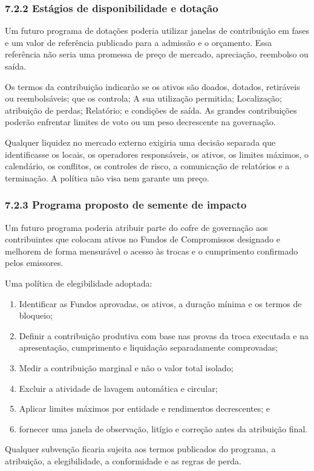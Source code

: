 \documentclass[11pt]{article}
\begin{document}
\subsubsection*{7.2.2 Estágios de disponibilidade e dotação}

Um futuro programa de dotações poderia utilizar janelas de contribuição em fases e um valor de referência publicado para a admissão e o orçamento. Essa referência não seria uma promessa de preço de mercado, apreciação, reembolso ou saída.

Os termos da contribuição indicarão se os ativos são doados, dotados, retiráveis ou reembolsáveis; que os controla; A sua utilização permitida; Localização; atribuição de perdas; Relatório; e condições de saída. As grandes contribuições poderão enfrentar limites de voto ou um peso decrescente na governação.

Qualquer liquidez no mercado externo exigiria uma decisão separada que identificasse os locais, os operadores responsáveis, os ativos, os limites máximos, o calendário, os conflitos, os controles de risco, a comunicação de relatórios e a terminação. A política não visa nem garante um preço.

\subsubsection*{7.2.3 Programa proposto de semente de impacto}

Um futuro programa poderia atribuir parte do cofre de governação aos contribuintes que colocam ativos no Fundos de Compromissos designado e melhorem de forma mensurável o acesso às trocas e o cumprimento confirmado pelos emissores.

Uma política de elegibilidade adoptada:

\begin{enumerate}[leftmargin=*]
\item Identificar as Fundos aprovadas, os ativos, a duração mínima e os termos de bloqueio;
\item Definir a contribuição produtiva com base nas provas da troca executada e na apresentação, cumprimento e liquidação separadamente comprovadas;
\item Medir a contribuição marginal e não o valor total isolado;
\item Excluir a atividade de lavagem automática e circular;
\item Aplicar limites máximos por entidade e rendimentos decrescentes; e
\item fornecer uma janela de observação, litígio e correção antes da atribuição final.
\end{enumerate}
Qualquer subvenção ficaria sujeita aos termos publicados do programa, a atribuição, a elegibilidade, a conformidade e as regras de perda.
\end{document}
